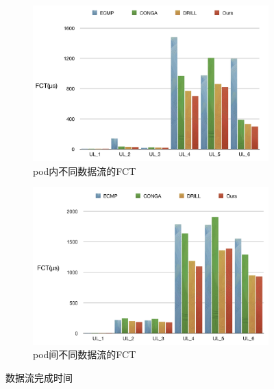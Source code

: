 \begin{figure}[htb!]
\centering
\begin{subfigure}{0.47\textwidth}
     \includegraphics[width=\textwidth]{figure/intrapod.png}
     \caption{pod内不同数据流的FCT}
\end{subfigure}\hspace{2em}
\begin{subfigure}{0.47\textwidth}
    \includegraphics[width=\textwidth]{figure/interpod.png}
    \caption{pod间不同数据流的FCT}

\end{subfigure}%
\caption{数据流完成时间}
\label{fig:podfct}
\end{figure}


